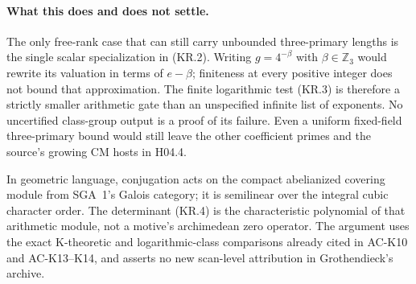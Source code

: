 \paragraph{What this does and does not settle.}
The only free-rank case that can still carry unbounded
three-primary lengths is the single scalar specialization
in (KR.2).  Writing $g=4^{-\beta}$ with $\beta\in\mathbb Z_3$
would rewrite its valuation in terms of $e-\beta$; finiteness
at every positive integer does not bound that approximation.
The finite logarithmic test (KR.3) is therefore a strictly
smaller arithmetic gate than an unspecified infinite list
of exponents.  No uncertified class-group output is a proof
of its failure.  Even a uniform fixed-field three-primary
bound would still leave the other coefficient primes and
the source's growing CM hosts in H04.4.

In geometric language, conjugation acts on the compact
abelianized covering module from SGA~1's Galois category;
it is semilinear over the integral cubic character order.
The determinant (KR.4) is the characteristic polynomial
of that arithmetic module, not a motive's archimedean
zero operator.  The argument uses the exact K-theoretic
and logarithmic-class comparisons already cited in
AC-K10 and AC-K13--K14, and asserts no new scan-level
attribution in Grothendieck's archive.
